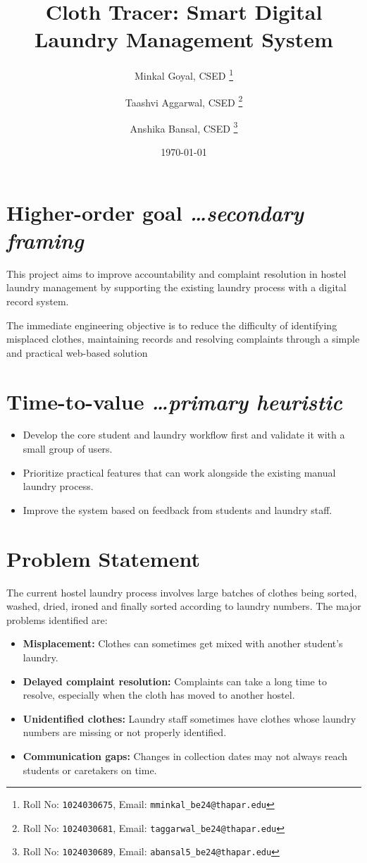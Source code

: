 \documentclass[11pt,a4paper]{article}
\title{Cloth Tracer: Smart Digital Laundry Management System}
\author{
  Minkal Goyal, CSED%
  \thanks{Roll No: \texttt{1024030675}, %
    Email: \texttt{mminkal\_be24@thapar.edu}}
  \and 
  Taashvi Aggarwal, CSED%
  \thanks{Roll No: \texttt{1024030681}, %
    Email: \texttt{taggarwal\_be24@thapar.edu}}
\and 
  Anshika Bansal, CSED%
  \thanks{Roll No: \texttt{1024030689}, %
    Email: \texttt{abansal5\_be24@thapar.edu}}
}
\date{\today}
\newcommand{\BvrHint}[1]{%
  {\normalfont\normalsize\itshape\hfill #1}}
\begin{document}
\maketitle

\section{Higher-order goal%
  \BvrHint{\ldots secondary framing}}
This project aims to improve accountability and complaint resolution in hostel laundry management by supporting the existing laundry process with a digital record system.

The immediate engineering objective is to reduce the difficulty of identifying misplaced clothes, maintaining records and resolving complaints through a simple and practical web-based solution

\section{Time-to-value %
\BvrHint{\ldots primary heuristic}}
\begin{itemize}[leftmargin=0.7cm]
    \item Develop the core student and laundry workflow first and validate it with a small group of users.
    \item Prioritize practical features that can work alongside the existing manual laundry process.
    \item Improve the system based on feedback from students and laundry staff.
\end{itemize}

\section{Problem Statement}
The current hostel laundry process involves large batches of clothes being sorted, washed, dried, ironed and finally sorted according to laundry numbers. The major problems identified are:
\begin{itemize}[leftmargin=0.7cm]
    \item \textbf{Misplacement:} Clothes can sometimes get mixed with another student's laundry.
    \item \textbf{Delayed complaint resolution:} Complaints can take a long time to resolve, especially when the cloth has moved to another hostel.
    \item \textbf{Unidentified clothes:} Laundry staff sometimes have clothes whose laundry numbers are missing or not properly identified.
    \item \textbf{Communication gaps:} Changes in collection dates may not always reach students or caretakers on time.
\end{itemize}
\end{document}
